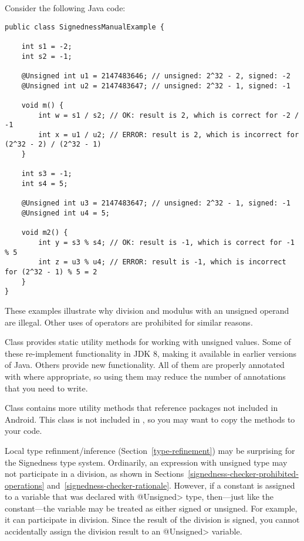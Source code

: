 Consider the following Java code:

\begin{Verbatim}
public class SignednessManualExample {

    int s1 = -2;
    int s2 = -1;

    @Unsigned int u1 = 2147483646; // unsigned: 2^32 - 2, signed: -2
    @Unsigned int u2 = 2147483647; // unsigned: 2^32 - 1, signed: -1

    void m() {
        int w = s1 / s2; // OK: result is 2, which is correct for -2 / -1
        int x = u1 / u2; // ERROR: result is 2, which is incorrect for (2^32 - 2) / (2^32 - 1)
    }

    int s3 = -1;
    int s4 = 5;

    @Unsigned int u3 = 2147483647; // unsigned: 2^32 - 1, signed: -1
    @Unsigned int u4 = 5;

    void m2() {
        int y = s3 % s4; // OK: result is -1, which is correct for -1 % 5
        int z = u3 % u4; // ERROR: result is -1, which is incorrect for (2^32 - 1) % 5 = 2
    }
}
\end{Verbatim}

These examples illustrate why division and modulus with an unsigned operand
are illegal.  Other uses of operators are prohibited for similar reasons.



Class  provides static
utility methods for working with unsigned values.  Some of these
re-implement functionality in JDK 8, making it available in earlier
versions of Java.  Others provide new functionality.  All of them are
properly annotated with 
where appropriate, so using them may reduce the number of annotations that
you need to write.

Class  contains more utility
methods that reference packages not included in Android.  This class is not
included in , so you may want to copy the methods to your code.



Local type refinment/inference (Section~\ref{type-refinement}) may be
surprising for the Signedness type system.  Ordinarily, an expression with
unsigned type may not participate in a division, as shown in
Sections~\ref{signedness-checker-prohibited-operations}
and~\ref{signedness-checker-rationale}.  However, if a constant is assigned
to a variable that was declared with \<@Unsigned> type, then---just like
the constant---the variable may be treated as either signed or unsigned.
For example, it can participate in division.  Since the result of the
division is signed, you cannot accidentally assign the division result to
an \<@Unsigned> variable.

